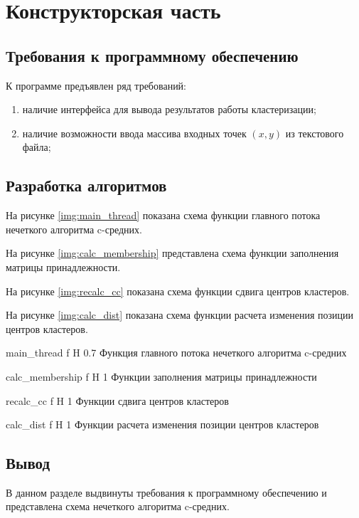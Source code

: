 \chapter{Конструкторская часть}

\section{Требования к программному обеспечению}

К программе предъявлен ряд требований:
\begin{enumerate}
	\item наличие интерфейса для вывода результатов работы кластеризации;
	\item наличие возможности ввода массива входных точек $(x, y)$ из текстового файла;
\end{enumerate}

\section{Разработка алгоритмов}

На рисунке \ref{img:main_thread} показана схема функции главного потока нечеткого алгоритма c-средних.

На рисунке \ref{img:calc_membership} представлена схема функции заполнения матрицы принадлежности.

На рисунке \ref{img:recalc_cc} показана схема функции сдвига центров кластеров.

На рисунке \ref{img:calc_dist} показана схема функции расчета изменения позиции центров кластеров.

	{main_thread}
	{f}
	{H}
	{0.7\textwidth}
	{Функция главного потока нечеткого алгоритма c-средних}
	
	{calc_membership}
	{f}
	{H}
	{1\textwidth}
	{Функции заполнения матрицы принадлежности}
	
	{recalc_cc}
	{f}
	{H}
	{1\textwidth}
	{Функции сдвига центров кластеров}
	
	{calc_dist}
	{f}
	{H}
	{1\textwidth}
	{Функции расчета изменения позиции центров кластеров}

\section*{Вывод}

В данном разделе выдвинуты требования к программному обеспечению и представлена схема нечеткого алгоритма c-средних.